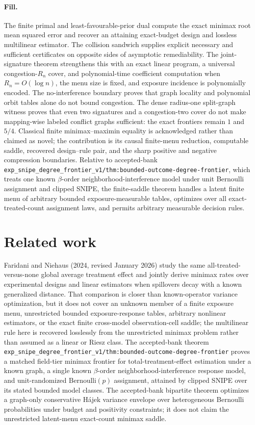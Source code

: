 \documentclass{article}
\begin{document}
\paragraph{Fill.} The finite primal and least-favourable-prior dual compute the exact minimax root mean squared error and recover an attaining exact-budget design and lossless multilinear estimator. The collision sandwich supplies explicit necessary and sufficient certificates on opposite sides of asymptotic remediability. The joint-signature theorem strengthens this with an exact linear program, a universal congestion-\(R_n\) cover, and polynomial-time coefficient computation when \(R_n=O(\log n)\), the menu size is fixed, and exposure incidence is polynomially encoded. The no-interference boundary proves that graph locality and polynomial orbit tables alone do not bound congestion. The dense radius-one split-graph witness proves that even two signatures and a congestion-two cover do not make mapping-wise labeled conflict graphs sufficient: the exact frontiers remain \(1\) and \(5/4\). Classical finite minimax--maximin equality is acknowledged rather than claimed as novel; the contribution is its causal finite-menu reduction, computable saddle, recovered design--rule pair, and the sharp positive and negative compression boundaries. Relative to accepted-bank \texttt{exp\_snipe\_degree\_frontier\_v1/thm:bounded-outcome-degree-frontier}, which treats one known \(\beta\)-order neighborhood-interference model under unit Bernoulli assignment and clipped SNIPE, the finite-saddle theorem handles a latent finite menu of arbitrary bounded exposure-measurable tables, optimizes over all exact-treated-count assignment laws, and permits arbitrary measurable decision rules.

\section{Related work}

Faridani and Niehaus (2024, revised January 2026) study the same all-treated-versus-none global average treatment effect and jointly derive minimax rates over experimental designs and linear estimators when spillovers decay with a known generalized distance. That comparison is closer than known-operator variance optimization, but it does not cover an unknown member of a finite exposure menu, unrestricted bounded exposure-response tables, arbitrary nonlinear estimators, or the exact finite cross-model observation-cell saddle; the multilinear rule here is recovered losslessly from the unrestricted minimax problem rather than assumed as a linear or Riesz class. The accepted-bank theorem \texttt{exp\_snipe\_degree\_frontier\_v1/thm:bounded-outcome-degree-frontier} proves a matched field-tier minimax frontier for total-treatment-effect estimation under a known graph, a single known \(\beta\)-order neighborhood-interference response model, and unit-randomized Bernoulli\((p)\) assignment, attained by clipped SNIPE over its stated bounded model classes. The accepted-bank bipartite theorem optimizes a graph-only conservative H\'ajek variance envelope over heterogeneous Bernoulli probabilities under budget and positivity constraints; it does not claim the unrestricted latent-menu exact-count minimax saddle.
\end{document}
